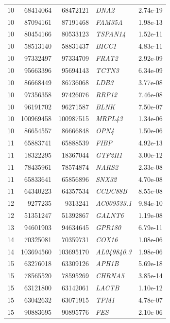 \begin{longtable}{rrrlr}
   10 & 68414064 & 68472121 & \textit{DNA2} & 2.74e-19 \\ 
   10 & 87094161 & 87191468 & \textit{FAM35A} & 1.98e-13 \\ 
   10 & 80454166 & 80533123 & \textit{TSPAN14} & 1.52e-11 \\ 
   10 & 58513140 & 58831437 & \textit{BICC1} & 4.83e-11 \\ 
   10 & 97332497 & 97334709 & \textit{FRAT2} & 2.92e-09 \\ 
   10 & 95663396 & 95694143 & \textit{TCTN3} & 6.34e-09 \\ 
   10 & 86668449 & 86736068 & \textit{LDB3} & 3.77e-08 \\ 
   10 & 97356358 & 97426076 & \textit{RRP12} & 7.46e-08 \\ 
   10 & 96191702 & 96271587 & \textit{BLNK} & 7.50e-07 \\ 
   10 & 100969458 & 100987515 & \textit{MRPL43} & 1.34e-06 \\ 
   10 & 86654557 & 86666848 & \textit{OPN4} & 1.50e-06 \\ 
   11 & 65883741 & 65888539 & \textit{FIBP} & 4.92e-13 \\ 
   11 & 18322295 & 18367044 & \textit{GTF2H1} & 3.00e-12 \\ 
   11 & 78435961 & 78574874 & \textit{NARS2} & 2.33e-08 \\ 
   11 & 65833641 & 65856896 & \textit{SNX32} & 4.70e-08 \\ 
   11 & 64340223 & 64357534 & \textit{CCDC88B} & 8.55e-08 \\ 
   12 & 9277235 & 9313241 & \textit{AC009533.1} & 9.84e-10 \\ 
   12 & 51351247 & 51392867 & \textit{GALNT6} & 1.19e-08 \\ 
   13 & 94601903 & 94634645 & \textit{GPR180} & 6.79e-11 \\ 
   14 & 70325081 & 70359731 & \textit{COX16} & 1.08e-06 \\ 
   14 & 103694560 & 103695170 & \textit{AL049840.3} & 1.98e-06 \\ 
   15 & 63276018 & 63309126 & \textit{APH1B} & 5.69e-18 \\ 
   15 & 78565520 & 78595269 & \textit{CHRNA5} & 3.85e-14 \\ 
   15 & 63121800 & 63142061 & \textit{LACTB} & 1.10e-12 \\ 
   15 & 63042632 & 63071915 & \textit{TPM1} & 4.78e-07 \\ 
   15 & 90883695 & 90895776 & \textit{FES} & 2.10e-06 \\ 

\end{longtable}
